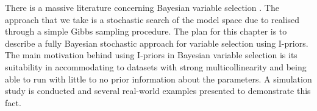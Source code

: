 \documentclass[a4paper,showframe,11pt]{report}
\begin{document}
\newpage










There is a massive literature concerning Bayesian variable selection \citep{Chipman2001,OHara2009}.
The approach that we take is a stochastic search of the model space due to \citet{George1993,Kuo1998} realised through a simple Gibbs sampling procedure.
The plan for this chapter is to describe a fully Bayesian stochastic approach for variable selection using I-priors. 
The main motivation behind using I-priors in Bayesian variable selection is its suitability in accommodating to datasets with strong multicollinearity and being able to run with little to no prior information about the parameters.
A simulation study is conducted and several real-world examples presented to demonstrate this fact. 


\end{document}
